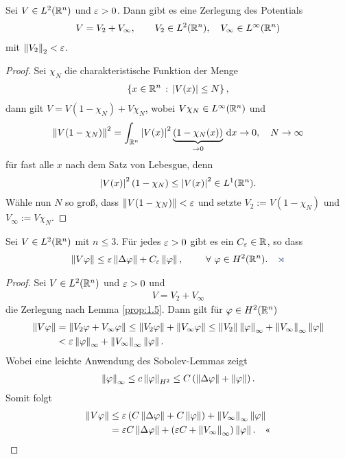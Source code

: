 \begin{lem}
\label{prop:1.5}
Sei $V\in L^2(\mathbb{R}^n)$ und $\varepsilon > 0$. Dann gibt es eine Zerlegung des Potentials
\begin{align*}
V = V_2 + V_\infty,\qquad V_2\in L^2(\mathbb{R}^n),\quad V_\infty\in L^\infty(\mathbb{R}^n)
\end{align*}
mit $\left\|V_2\right\|_2 < \varepsilon$.\fishhere
\end{lem}
\begin{proof}
Sei $\chi_N$ die charakteristische Funktion der Menge
\begin{align*}
\left\{ x\in\mathbb{R}^n\,:\,\left|V(x)\right|\le N\right\},
\end{align*}
dann gilt $V = V(1-\chi_N) + V\chi_N$, wobei $V\chi_N \in L^\infty(\mathbb{R}^n)$ und
\begin{align*}
\left\|V(1-\chi_N)\right\|^2 = \int_{\mathbb{R}^n}\left|V(x)\right|^2\underbrace{(1-\chi_N(x))}_{\to
0}\,\mathrm{d} x \to 0,\quad N\to
\infty
\end{align*}
für fast alle $x$ nach dem Satz von Lebesgue, denn
\begin{align*}
\left|V(x)\right|^2(1-\chi_N) \le \left|V(x)\right|^2 \in L^1(\mathbb{R}^n).
\end{align*}
Wähle nun $N$ so groß, dass $\left\|V(1-\chi_N)\right\| < \varepsilon$ und setzte $V_2 :=
V(1-\chi_N)$ und $V_\infty := V\chi_N$.\qedhere
\end{proof}

\begin{thm}
\label{prop:1.6}
Sei $V\in L^2(\mathbb{R}^n)$ mit $n\le 3$. Für jedes $\varepsilon > 0$ gibt es ein
$C_\varepsilon\in\mathbb{R}$, so dass
\begin{align*}
\norm{V\ph} \le \ep \norm{\Delta \ph} + C_\ep\norm{\ph},\qquad
\forall \ph\in H^2(\R^n).\fishhere
\end{align*}
\end{thm}
\begin{proof}
Sei $V\in L^2(\mathbb{R}^n)$ und $\varepsilon > 0$ und
\begin{align*}
V = V_2 + V_\infty 
\end{align*}
die Zerlegung nach Lemma \ref{prop:1.5}. Dann gilt für $\varphi\in H^2(\mathbb{R}^n)$
\begin{align*}
\left\|V\varphi\right\| &= \left\|V_2\varphi + V_\infty \varphi\right\| \le
\left\|V_2\varphi\right\| + \left\|V_\infty\varphi\right\|
\le
\left\|V_2\right\|\left\|\varphi\right\|_\infty + \left\|V_\infty\right\|_\infty\left\|\varphi\right\|\\
&< \varepsilon \left\|\varphi\right\|_\infty + \left\|V_\infty\right\|_\infty \left\|\varphi\right\|.
\end{align*}
Wobei eine leichte Anwendung des Sobolev-Lemmas zeigt
\begin{align*}
\left\|\varphi\right\|_\infty \le c\left\|\varphi\right\|_{H^2}
\le C\left(\left\|\Delta \varphi\right\| + \left\|\varphi\right\|\right).
\end{align*}
Somit folgt
\begin{align*}
\left\|V\varphi\right\| &\le \varepsilon\left(C\left\|\Delta \varphi\right\|  + C\left\|\varphi\right\|\right)
+ \left\|V_\infty\right\|_\infty\left\|\varphi\right\|\\
&= \varepsilon C\left\|\Delta \varphi\right\| + (\varepsilon C + \left\|V_\infty\right\|_\infty)\left\|\varphi\right\|.\quad\text{<<}
\end{align*}
\end{proof}


